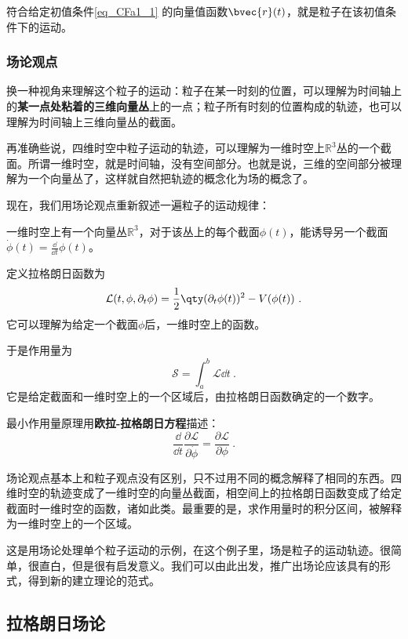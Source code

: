 符合给定初值条件\autoref{eq_CFa1_1} 的向量值函数$\bvec{r}(t)$，就是粒子在该初值条件下的运动。


\subsubsection{场论观点}

换一种视角来理解这个粒子的运动：粒子在某一时刻的位置，可以理解为时间轴上的\textbf{某一点处粘着的三维向量丛}上的一点；粒子所有时刻的位置构成的轨迹，也可以理解为时间轴上三维向量丛的截面。

再准确些说，四维时空中粒子运动的轨迹，可以理解为一维时空上$\mathbb{R}^3$丛的一个截面。所谓一维时空，就是时间轴，没有空间部分。也就是说，三维的空间部分被理解为一个向量丛了，这样就自然把轨迹的概念化为场的概念了。

现在，我们用场论观点重新叙述一遍粒子的运动规律：

一维时空上有一个向量丛$\mathbb{R}^3$，对于该丛上的每个截面$\phi(t)$，能诱导另一个截面$\dot{\phi}(t)=\frac{\dd}{\dd t}\phi(t)$。

定义拉格朗日函数为
\begin{equation}\label{eq_CFa1_2}
\mathcal{L}(t, \phi, \partial_t\phi) = \frac{1}{2}\qty(\partial_t \phi(t))^2 - V(\phi(t))~.
\end{equation}
它可以理解为给定一个截面$\phi$后，一维时空上的函数。

于是作用量为
\begin{equation}\label{eq_CFa1_4}
\mathcal{S}=\int_a^b \mathcal{L}\dd t~.
\end{equation}
它是给定截面和一维时空上的一个区域后，由拉格朗日函数确定的一个数字。

最小作用量原理用\textbf{欧拉-拉格朗日方程}描述：
\begin{equation}
\frac{\dd}{\dd t}\frac{\partial\mathcal{L}}{\partial\dot{\phi}} = \frac{\partial \mathcal{L}}{\partial\phi}~.
\end{equation}

场论观点基本上和粒子观点没有区别，只不过用不同的概念解释了相同的东西。四维时空的轨迹变成了一维时空的向量丛截面，相空间上的拉格朗日函数变成了给定截面时一维时空的函数，诸如此类。最重要的是，求作用量时的积分区间，被解释为一维时空上的一个区域。

这是用场论处理单个粒子运动的示例，在这个例子里，场是粒子的运动轨迹。很简单，很直白，但是很有启发意义。我们可以由此出发，推广出场论应该具有的形式，得到新的建立理论的范式。


\subsection{拉格朗日场论}

